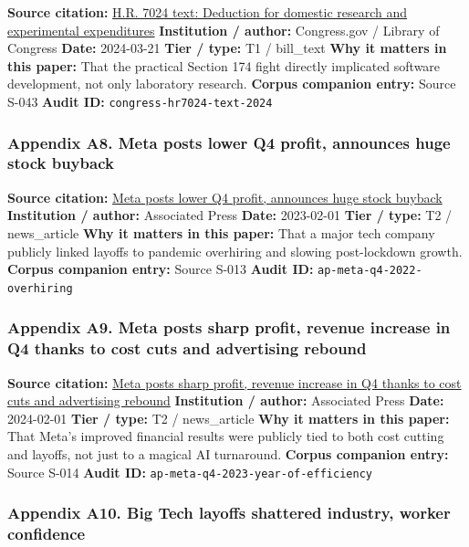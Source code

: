 \documentclass[
  american,
  11pt,
  letterpaper,
]{article}
\begin{document}
\textbf{Source citation:}
\href{https://www.congress.gov/bill/118th-congress/house-bill/7024/text}{H.R.
7024 text: Deduction for domestic research and experimental
expenditures} \textbf{Institution / author:} Congress.gov / Library of
Congress \textbf{Date:} 2024-03-21 \textbf{Tier / type:} T1 / bill\_text
\textbf{Why it matters in this paper:} That the practical Section 174
fight directly implicated software development, not only laboratory
research. \textbf{Corpus companion entry:} Source S-043 \textbf{Audit
ID:} \texttt{congress-hr7024-text-2024}

\subsubsection{Appendix A8. Meta posts lower Q4 profit, announces huge
stock
buyback}\label{ch-05-appendix-a8-meta-posts-lower-q4-profit-announces-huge-stock-buyback}

\textbf{Source citation:}
\href{https://apnews.com/article/b884c9ac96be1c22f81d7243176a321d}{Meta
posts lower Q4 profit, announces huge stock buyback} \textbf{Institution
/ author:} Associated Press \textbf{Date:} 2023-02-01 \textbf{Tier /
type:} T2 / news\_article \textbf{Why it matters in this paper:} That a
major tech company publicly linked layoffs to pandemic overhiring and
slowing post-lockdown growth. \textbf{Corpus companion entry:} Source
S-013 \textbf{Audit ID:} \texttt{ap-meta-q4-2022-overhiring}

\subsubsection{Appendix A9. Meta posts sharp profit, revenue increase in
Q4 thanks to cost cuts and advertising
rebound}\label{ch-05-appendix-a9-meta-posts-sharp-profit-revenue-increase-in-q4-thanks-to-cost-cuts-and-advertising-rebound}

\textbf{Source citation:}
\href{https://apnews.com/article/abc3e389d97fb97c661ccb6acfcf65c7}{Meta
posts sharp profit, revenue increase in Q4 thanks to cost cuts and
advertising rebound} \textbf{Institution / author:} Associated Press
\textbf{Date:} 2024-02-01 \textbf{Tier / type:} T2 / news\_article
\textbf{Why it matters in this paper:} That Meta's improved financial
results were publicly tied to both cost cutting and layoffs, not just to
a magical AI turnaround. \textbf{Corpus companion entry:} Source S-014
\textbf{Audit ID:} \texttt{ap-meta-q4-2023-year-of-efficiency}

\subsubsection{Appendix A10. Big Tech layoffs shattered industry, worker
confidence}\label{ch-05-appendix-a10-big-tech-layoffs-shattered-industry-worker-confidence}
\end{document}
